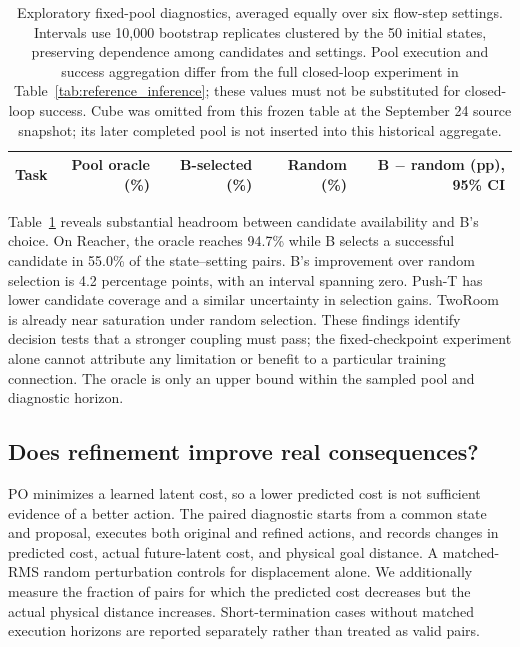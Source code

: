 \begin{table}[t]
 \centering\small
 \begin{tabular}{lrrrr}
 \toprule
 Task & Pool oracle (\%) & B-selected (\%) & Random (\%) & B $-$ random (pp), 95\% CI \\
 \midrule
 
 \bottomrule
 \end{tabular}
 \caption{Exploratory fixed-pool diagnostics, averaged equally over six flow-step settings. Intervals use 10,000 bootstrap replicates clustered by the 50 initial states, preserving dependence among candidates and settings. Pool execution and success aggregation differ from the full closed-loop experiment in Table~\ref{tab:reference_inference}; these values must not be substituted for closed-loop success. Cube was omitted from this frozen table at the September 24 source snapshot; its later completed pool is not inserted into this historical aggregate.}
 \label{tab:reference_ranking}
\end{table}

Table~\ref{tab:reference_ranking} reveals substantial headroom between candidate availability and B's choice. On Reacher, the oracle reaches 94.7\% while B selects a successful candidate in 55.0\% of the state--setting pairs. B's improvement over random selection is 4.2 percentage points, with an interval spanning zero. Push-T has lower candidate coverage and a similar uncertainty in selection gains. TwoRoom is already near saturation under random selection. These findings identify decision tests that a stronger coupling must pass; the fixed-checkpoint experiment alone cannot attribute any limitation or benefit to a particular training connection. The oracle is only an upper bound within the sampled pool and diagnostic horizon.

\subsection{Does refinement improve real consequences?}
PO minimizes a learned latent cost, so a lower predicted cost is not sufficient evidence of a better action. The paired diagnostic starts from a common state and proposal, executes both original and refined actions, and records changes in predicted cost, actual future-latent cost, and physical goal distance. A matched-RMS random perturbation controls for displacement alone. We additionally measure the fraction of pairs for which the predicted cost decreases but the actual physical distance increases. Short-termination cases without matched execution horizons are reported separately rather than treated as valid pairs.

